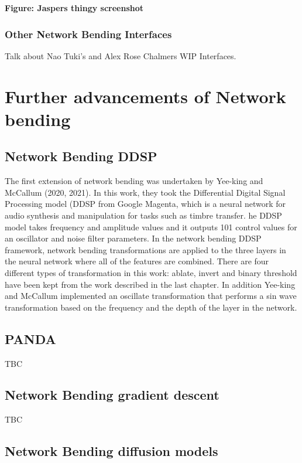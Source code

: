 \textbf{Figure: Jaspers thingy screenshot}

\subsubsection{Other Network Bending Interfaces}

Talk about Nao Tuki's and Alex Rose Chalmers WIP Interfaces.

\section{Further advancements of Network bending}

\subsection{Network Bending DDSP}

The first extension of network bending was undertaken by Yee-king and McCallum (2020, 2021). 
In this work, they took the Differential Digital Signal Processing model (DDSP from Google Magenta, which is a neural network for audio synthesis and manipulation for tasks such as timbre transfer. 
he DDSP model takes frequency and amplitude values and it outputs 101 control values for an oscillator and noise filter parameters. 
In the network bending DDSP framework, network bending transformations are applied to the three layers in the neural network where all of the features are combined. 
There are four different types of transformation in this work: ablate, invert and binary threshold have been kept from the work described in the last chapter.
 In addition Yee-king and McCallum implemented an oscillate transformation that performs a sin wave transformation based on the frequency and the depth of the layer in the network. 

\subsection{PANDA}

TBC

\subsection{Network Bending gradient descent}

TBC

\subsection{Network Bending diffusion models}

